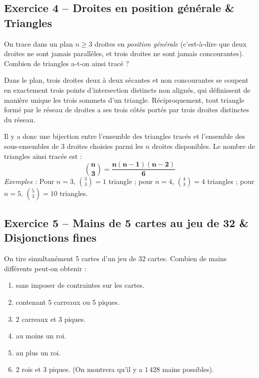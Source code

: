 \documentclass[11pt,a4paper]{article}
\begin{document}
\vspace{0.3cm}

\subsection*{Exercice 4 -- Droites en position générale \& Triangles}

On trace dans un plan $n \ge 3$ droites en \emph{position générale} (c'est-à-dire que deux droites ne sont jamais parallèles, et trois droites ne sont jamais concourantes).
Combien de triangles a-t-on ainsi tracé ?

\begin{correctionbox}
Dans le plan, trois droites deux à deux sécantes et non concourantes se coupent en exactement trois points d'intersection distincts non alignés, qui définissent de manière unique les trois sommets d'un triangle.
Réciproquement, tout triangle formé par le réseau de droites a ses trois côtés portés par trois droites distinctes du réseau.

Il y a donc une bijection entre l'ensemble des triangles tracés et l'ensemble des sous-ensembles de 3 droites choisies parmi les $n$ droites disponibles.
Le nombre de triangles ainsi tracés est :
\[
\mathbf{\binom{n}{3} = \frac{n(n-1)(n-2)}{6}}
\]
\emph{Exemples :} Pour $n = 3$, $\binom{3}{3} = 1$ triangle ; pour $n = 4$, $\binom{4}{3} = 4$ triangles ; pour $n = 5$, $\binom{5}{3} = 10$ triangles.
\end{correctionbox}

\vspace{0.3cm}

\subsection*{Exercice 5 -- Mains de 5 cartes au jeu de 32 \& Disjonctions fines}

On tire simultanément 5 cartes d'un jeu de 32 cartes. Combien de mains différents peut-on obtenir :
\begin{enumerate}[label=\arabic*.]
    \item sans imposer de contraintes sur les cartes.
    \item contenant 5 carreaux ou 5 piques.
    \item 2 carreaux et 3 piques.
    \item au moins un roi.
    \item au plus un roi.
    \item 2 rois et 3 piques. (On montrera qu'il y a $1\,428$ mains possibles).
\end{enumerate}
\end{document}

